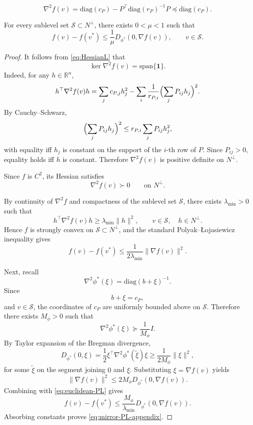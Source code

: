 \documentclass[10pt,a4paper]{amsart}
\begin{document}
\begin{equation}\label{eq:HessianL}
\nabla^2 f(v)=\mathrm{diag}(c_P)-P^\top \mathrm{diag}(r_P)^{-1}P\preceq \mathrm{diag}(c_P).
\end{equation}

\begin{lemma}\label{prop:PL}
For every sublevel set $\mathcal S\subset N^\perp$, there exists $0<\mu < 1$ such that
\begin{equation}\label{eq:mirror-PL-appendix}
f(v)-f(v^*)
\le
\frac1\mu D_{\phi^*}(0,\nabla f(v)),
\qquad
v\in\mathcal S.
\end{equation}
\end{lemma}

\begin{proof}
It follows from \eqref{eq:HessianL} that
\[
\ker \nabla^2 f(v)=\mathrm{span}\{\mathbf 1\}.
\]
Indeed, for any $h\in\mathbb R^n$,
\[
h^\top \nabla^2 f(v)h
=
\sum_j c_{P,j}h_j^2
-
\sum_i \frac1{r_{P,i}}
\Bigl(\sum_j P_{ij}h_j\Bigr)^2.
\]
By Cauchy--Schwarz,
\[
\Bigl(\sum_j P_{ij}h_j\Bigr)^2
\le
r_{P,i}\sum_j P_{ij}h_j^2,
\]
with equality iff $h_j$ is constant on the support of the $i$-th row of $P$.
Since $P_{ij}>0$, equality holds iff $h$ is constant.
Therefore $\nabla^2 f(v)$ is positive definite on $N^\perp$.

Since $f$ is $C^2$, its Hessian satisfies
\[
\nabla^2 f(v)\succ 0
\qquad\text{on }N^\perp.
\]

By continuity of $\nabla^2 f$ and compactness of the sublevel set $\mathcal S$, there exists $\lambda_{\min}>0$ such that
\[
h^\top \nabla^2 f(v) h
\ge
\lambda_{\min}\|h\|^2,
\qquad
v\in\mathcal S,
\quad
h\in N^\perp.
\]
Hence $f$ is strongly convex on $\mathcal S\subset N^\perp$, and the standard Polyak--\L ojasiewicz inequality gives
\begin{equation}
\label{eq:euclidean-PL}
f(v)-f(v^*)
\le
\frac{1}{2\lambda_{\min}}
\|\nabla f(v)\|^2.
\end{equation}

Next, recall
\[
\nabla^2\phi^*(\xi)
=
\mathrm{diag}(b+\xi)^{-1}.
\]
Since
\[
b+\xi=c_P,
\]
and $v\in\mathcal S$, the coordinates of $c_P$ are uniformly bounded above on $\mathcal S$.
Therefore there exists $M_\phi>0$ such that
\[
\nabla^2\phi^*(\xi)
\succeq
\frac1{M_\phi}I.
\]
By Taylor expansion of the Bregman divergence,
\[
D_{\phi^*}(0,\xi)
=
\frac12
\xi^\top
\nabla^2\phi^*(\tilde\xi)\xi
\ge
\frac1{2M_\phi}\|\xi\|^2,
\]
for some $\tilde\xi$ on the segment joining $0$ and $\xi$.
Substituting $\xi=\nabla f(v)$ yields
\[
\|\nabla f(v)\|^2
\le
2M_\phi D_{\phi^*}(0,\nabla f(v)).
\]
Combining with \eqref{eq:euclidean-PL} gives
\[
f(v)-f(v^*)
\le
\frac{M_\phi}{\lambda_{\min}}
D_{\phi^*}(0,\nabla f(v)).
\]
Absorbing constants proves \eqref{eq:mirror-PL-appendix}.
\end{proof}
\end{document}
